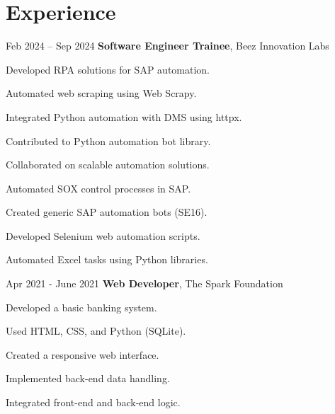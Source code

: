 \section{Experience}
\begin{twocolentry}{Feb 2024 – Sep 2024}
\textbf{Software Engineer Trainee}, Beez Innovation Labs\end{twocolentry}
\vspace{0.10 cm}
\begin{onecolentry}
\begin{highlights}
\item Developed RPA solutions for SAP automation.
\item Automated web scraping using Web Scrapy.
\item Integrated Python automation with DMS using httpx.
\item Contributed to Python automation bot library.
\item Collaborated on scalable automation solutions.
\item Automated SOX control processes in SAP.
\item Created generic SAP automation bots (SE16).
\item Developed Selenium web automation scripts.
\item Automated Excel tasks using Python libraries.
\end{highlights}
\end{onecolentry}
\vspace{0.2 cm}
\begin{twocolentry}{Apr 2021 - June 2021}
\textbf{Web Developer}, The Spark Foundation\end{twocolentry}
\vspace{0.10 cm}
\begin{onecolentry}
\begin{highlights}
\item Developed a basic banking system.
\item Used HTML, CSS, and Python (SQLite).
\item Created a responsive web interface.
\item Implemented back-end data handling.
\item Integrated front-end and back-end logic.
\end{highlights}
\end{onecolentry}


